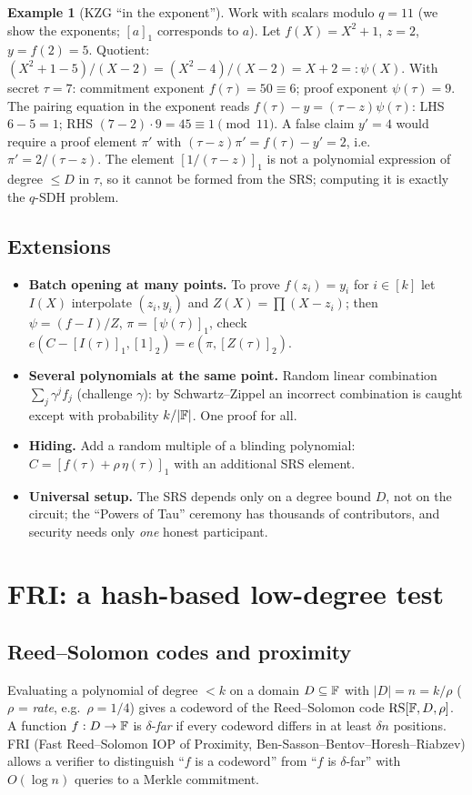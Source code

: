 \documentclass[11pt,a4paper]{report}
\theoremstyle{plain}
\theoremstyle{definition}
\newtheorem{example}[theorem]{Example}
\theoremstyle{remark}
\begin{document}
\begin{example}[KZG ``in the exponent'']
Work with scalars modulo $q=11$ (we show the exponents; $[a]_1$ corresponds to $a$). Let $f(X)=X^2+1$, $z=2$, $y=f(2)=5$. Quotient: $(X^2+1-5)/(X-2)=(X^2-4)/(X-2)=X+2=:\psi(X)$. With secret $\tau=7$: commitment exponent $f(\tau)=50\equiv6$; proof exponent $\psi(\tau)=9$. The pairing equation in the exponent reads $f(\tau)-y=(\tau-z)\psi(\tau)$: LHS $6-5=1$; RHS $(7-2)\cdot9=45\equiv1\pmod{11}$. \checkmark
A false claim $y'=4$ would require a proof element $\pi'$ with $(\tau-z)\pi'=f(\tau)-y'=2$, i.e.\ $\pi'=2/(\tau-z)$. The element $[1/(\tau-z)]_1$ is not a polynomial expression of degree $\le D$ in $\tau$, so it cannot be formed from the SRS; computing it is exactly the $q$-SDH problem.
\end{example}

\subsection{Extensions}
\begin{itemize}
\item \textbf{Batch opening at many points.} To prove $f(z_i)=y_i$ for $i\in[k]$ let $I(X)$ interpolate $(z_i,y_i)$ and $Z(X)=\prod(X-z_i)$; then $\psi=(f-I)/Z$, $\pi=[\psi(\tau)]_1$, check $e(C-[I(\tau)]_1,[1]_2)=e(\pi,[Z(\tau)]_2)$.
\item \textbf{Several polynomials at the same point.} Random linear combination $\sum_j\gamma^jf_j$ (challenge $\gamma$): by Schwartz--Zippel an incorrect combination is caught except with probability $k/|\mathbb{F}|$. One proof for all.
\item \textbf{Hiding.} Add a random multiple of a blinding polynomial: $C=[f(\tau)+\rho\,\eta(\tau)]_1$ with an additional SRS element.
\item \textbf{Universal setup.} The SRS depends only on a degree bound $D$, not on the circuit; the ``Powers of Tau'' ceremony has thousands of contributors, and security needs only \emph{one} honest participant.
\end{itemize}

\section{FRI: a hash-based low-degree test}
\subsection{Reed--Solomon codes and proximity}
Evaluating a polynomial of degree $<k$ on a domain $D\subseteq\mathbb{F}$ with $|D|=n=k/\rho$ ($\rho$ = \emph{rate}, e.g.\ $\rho=1/4$) gives a codeword of the Reed--Solomon code $\mathrm{RS}[\mathbb{F},D,\rho]$. A function $f:D\to\mathbb{F}$ is $\delta$-\emph{far} if every codeword differs in at least $\delta n$ positions. FRI (Fast Reed--Solomon IOP of Proximity, Ben-Sasson--Bentov--Horesh--Riabzev) allows a verifier to distinguish ``$f$ is a codeword'' from ``$f$ is $\delta$-far'' with $O(\log n)$ queries to a Merkle commitment.
\end{document}
